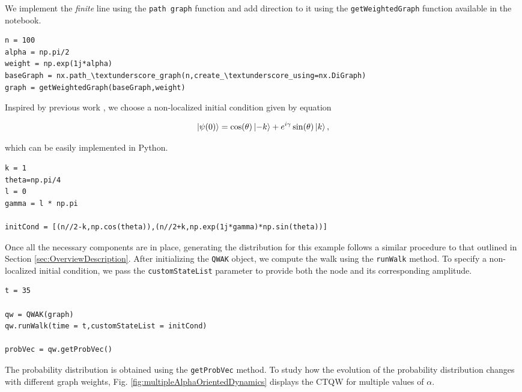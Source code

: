 \documentclass[main.tex]{subfiles}
\begin{document}
We implement the \textit{finite} line using the \texttt{path\textunderscore
graph} function and add direction to it using the \texttt{getWeightedGraph}
function available in the notebook.

\begin{lstlisting}[style=code,escapeinside={__}]
n = 100
alpha = np.pi/2
weight = np.exp(1j*alpha)
baseGraph = nx.path_\textunderscore_graph(n,create_\textunderscore_using=nx.DiGraph)
graph = getWeightedGraph(baseGraph,weight)
\end{lstlisting}

Inspired by previous work \cite{abalEffects06}, we choose a non-localized
initial condition given by equation

\begin{equation}
    \label{eq:survProbInitCond}
    \ket{\psi(0)} = \cos(\theta)\ket{-k} + e^{i\gamma}\sin(\theta)\ket{k},
\end{equation}


which can be easily implemented in Python. 

\begin{lstlisting}[style=code,escapeinside={__}]
k = 1
theta=np.pi/4
l = 0
gamma = l * np.pi

initCond = [(n//2-k,np.cos(theta)),(n//2+k,np.exp(1j*gamma)*np.sin(theta))]
\end{lstlisting}

Once all the necessary components are in place, generating the distribution for
this example follows a similar procedure to that outlined in Section
\ref{sec:OverviewDescription}. After initializing the \texttt{QWAK} object, we
compute the  walk using the \texttt{runWalk} method. To specify a
non-localized initial condition, we pass the \texttt{customStateList} parameter
to provide both the node and its corresponding amplitude.

\begin{lstlisting}[style=code,escapeinside={__}]
t = 35

qw = QWAK(graph)
qw.runWalk(time = t,customStateList = initCond)

probVec = qw.getProbVec()
\end{lstlisting}

The probability distribution is obtained using the \texttt{getProbVec} method. To
study how the evolution of the probability distribution changes with different
graph weights, Fig. \ref{fig:multipleAlphaOrientedDynamics} displays the CTQW
for multiple values of $\alpha$.
\end{document}
